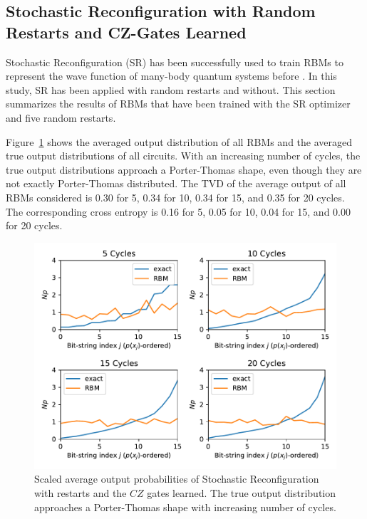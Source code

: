 \subsection{Stochastic Reconfiguration with Random Restarts and CZ-Gates Learned}

Stochastic Reconfiguration (SR) has been successfully used to train RBMs to represent the wave function 
of many-body quantum systems before \cite{carleo2017solving,medvidovic2020classical}. In this study, SR has been applied with random restarts 
and without. 
This section summarizes the results of RBMs that have been trained with the SR optimizer and five random 
restarts.

Figure~\ref{fig:sr_restarts_avgPDF} shows the averaged output distribution of all RBMs and 
the averaged true output distributions of all circuits. With an increasing number of cycles, the 
true output distributions approach a Porter-Thomas shape, even though they are not exactly Porter-Thomas 
distributed.
The TVD of the average output of all RBMs considered 
is 0.30 for 5, 0.34 for 10, 0.34 for 15, and 0.35 for 20 cycles. The corresponding cross entropy is 
0.16 for 5, 0.05 for 10, 0.04 for 15, and 0.00 for 20 cycles.

\begin{figure}[H]
  \centering
  \includegraphics[width=\textwidth]{figures/results/SR-restarts-learned/avgPDF.pdf}
  \caption[Scaled Average Output Probabilities of All RBMs Trained with Stochastic Reconfiguration with Random Restarts and the $CZ$ Gate Learned]{
    Scaled average output probabilities of Stochastic Reconfiguration with restarts and the $CZ$ gates learned. The true 
    output distribution approaches a Porter-Thomas shape with increasing number of cycles.}
  \label{fig:sr_restarts_avgPDF}
\end{figure}

